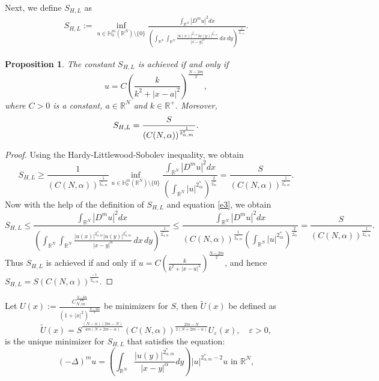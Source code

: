\documentclass[reqno]{amsart}
\newtheorem{proposition}[theorem]{Proposition}
\newcommand{\DD} {\displaystyle}
\newcommand{\eps}{\varepsilon}
\newcommand{\al} {\alpha}
\newcommand{\noi} {  \noindent}
\newcommand{\mb} {\mathbb}
\numberwithin{theorem}{section} \numberwithin{equation}{section}
\begin{document}
\noi Next, we define $S_{H, L}$ as
\begin{align}\label{e4}
S_{H, L}:= \inf_{u \in\mb{H}_0^m(\mb{R}^N) \setminus \{0\}} \frac{\int_{\mb{R}^N} |D^m u|^2 dx}{\left( \int_{\mb{R}^N} \int_{\mb{R}^N} \frac{|u(x)|^{2_{\al, m}^*} |u(y)|^{2_{\al, m}^*}}{|x - y|^\al} \, dx \, dy \right)^\frac{1}{2_{\al, m}^*}}.
\end{align}



\begin{proposition}%
The constant $S_{H, L}$ is achieved if and only if
\[u = C\left( \frac{k}{k^2 + |x - a|^2} \right)^{\frac{N - 2m}{2}},\]
where $C > 0$ is a constant, $a \in \mb{R}^N$ and $k \in \mb{R}^+$. Moreover,
\[S_{H, L} = \frac{S}{(C(N, \al))^{\frac{1}{2_{\al, m}^*}}}.\notag\]
\end{proposition}
\begin{proof}
Using the Hardy-Littlewood-Sobolev inequality, we obtain
\[S_{H, L} \geq \frac{1}{(C(N, \al))^{\frac{1}{2_{\al, m}^*}}} \inf_{u \in\mb {H}_0^m(\mb{R}^N) \setminus \{0\}} \frac{\int_{\mb{R}^N} |D^m u|^2 dx}{\left( \int_{\mb{R}^N} |u|^{2_m^*} \right)^\frac{2}{2_m^*}} = \frac{S}{(C(N, \al))^{\frac{1}{2_{\al, m}^*}}}.\]
Now with the help of the definition of $S_{H, L}$ and equation \eqref{e3}, we obtain \[S_{H, L} \leq \frac{\int_{\mb{R}^N} |D^m u|^2 dx}{\left( \int_{\mb{R}^N} \int_{\mb{R}^N} \frac{|u(x)|^{2_{\al, m}^*} |u(y)|^{2_{\al, m}^*}}{|x - y|^\al} \, dx \, dy \right)^\frac{1}{2_{\al, m}^*}}\leq\frac{\int_{\mb{R}^N} |D^m u|^2 dx}{{(C(N, \al))^{\frac{1}{2_{\al, m}^*}}}\left( \int_{\mb{R}^N} |u|^{2_m^*} \right)^\frac{2}{2_m^*}} = \frac{S}{(C(N, \al))^{\frac{1}{2_{\al, m}^*}}}.\]
Thus $S_{H, L}$ is achieved if and only if $u = C\left( \frac{k}{k^2 + |x - a|^2} \right)^{\frac{N - 2m}{2}}$, and hence 
$S_{H, L}=S(C(N, \al))^{\frac{-1}{2_{\al, m}^*}}.$
\end{proof} 
\noi Let $U(x):= \frac{C_{N,m}^{\frac{N-2m}{4m}}}{\left(1+|x|^2\right)^{\frac{N-2m}{2}}}$ be minimizers for $S$, then $\tilde{U}(x)$ be defined as \[\tilde{U}(x)=S^{\frac{(N-\al)(2m-N)}{4m(N+2m-\al)}}(C(N, \al))^{\frac{2m-N}{2(N+2m-\al)}}U_{\eps}(x), \quad \eps>0,\] is the unique minimizer for $S_{H, L}$ that satisfies the equation:
\begin{equation*}
(-\Delta)^m u = \left(\DD\int_{\mb{R}^N}\frac{|u(y)|^{2_{\al, m}^*}}{|x-y|^{\al}}dy\right) {|u|^{2_{\al,m}^*-2} u} \text{ in } \mb{R}^N,
\end{equation*}
\end{document}
